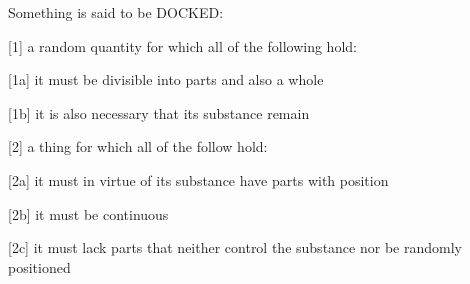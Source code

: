 
Something is said to be DOCKED:

[1]     a random quantity for which all of the following hold:

[1a]    it must be divisible into parts and also a whole

[1b]    it is also necessary that its substance remain

[2]     a thing for which all of the follow hold:

[2a]    it must in virtue of its substance have parts with position

[2b]    it must be continuous

[2c]    it must lack parts that neither control the substance nor be
        randomly positioned
